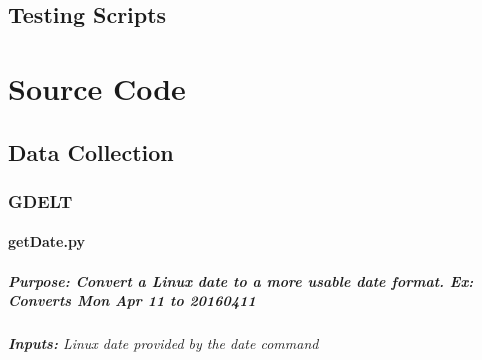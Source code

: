 \documentclass[letterpaper,12pt,english]{sphinxmanual}
\begin{document}
\section{Testing Scripts}
\label{testingScripts:testing-scripts}\label{testingScripts::doc}

\chapter{Source Code}
\label{code:source-code}\label{code::doc}

\section{Data Collection}
\label{dataCollectionCode:data-collection}\label{dataCollectionCode::doc}

\subsection{GDELT}
\label{gdeltCode:gdelt}\label{gdeltCode::doc}

\subsubsection{getDate.py}
\label{getDate::doc}\label{getDate:getdate-py}

\paragraph{\textbf{Purpose:} Convert a Linux date to a more usable date format. Ex: Converts \emph{Mon Apr 11} to \emph{20160411}}
\label{getDate:purpose-convert-a-linux-date-to-a-more-usable-date-format-ex-converts-mon-apr-11-to-20160411}

\subparagraph{\textbf{Inputs:} Linux date provided by the date command}
\label{getDate:inputs-linux-date-provided-by-the-date-command}
\end{document}
